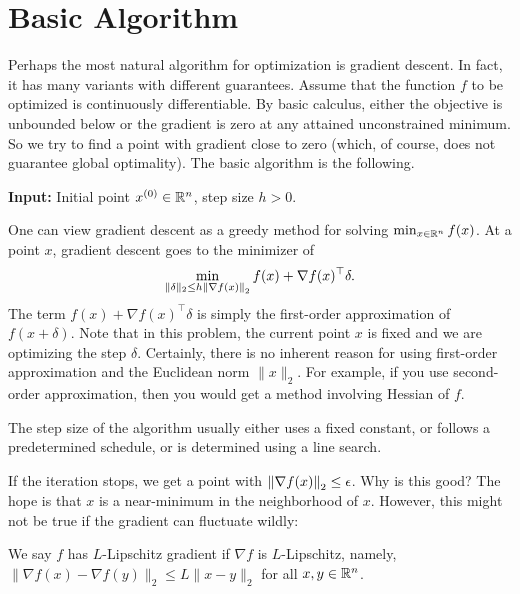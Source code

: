 \section{Basic Algorithm\label{sec:Gradient-Descent}}

Perhaps the most natural algorithm for optimization is gradient descent.
In fact, it has many variants with different guarantees. Assume that
the function $f$ to be optimized is continuously differentiable.
By basic calculus, either the objective is unbounded below or the
gradient is zero at any attained unconstrained minimum. So we try
to find a point with gradient close to zero (which, of course, does
not guarantee global optimality). The basic algorithm is the following. 

\begin{algorithm2e}[H]

\caption{$\mathtt{GradientDescent}$ (GD)}

\SetAlgoLined

\textbf{Input:} Initial point $x^{(0)}\in\mathbb{R}^{n}$, step size $h>0$.


\end{algorithm2e}

One can view gradient descent as a greedy method for solving $\min_{x\in\mathbb{R}^{n}}f(x)$.
At a point $x$, gradient descent goes to the minimizer of 
\[
\min_{\|\delta\|_{2}\leq h\left\Vert \nabla f(x)\right\Vert_{2}}f(x)+\nabla f(x)^{\top}\delta.
\]
The term $f(x)+\nabla f(x)^{\top}\delta$ is simply the first-order
approximation of $f(x+\delta)$. Note that in this problem, the current
point $x$ is fixed and we are optimizing the step $\delta$. Certainly,
there is no inherent reason for using first-order approximation and
the Euclidean norm $\|x\|_{2}$. For example, if you use second-order
approximation, then you would get a method involving Hessian of $f$.

The step size of the algorithm usually either uses a fixed constant,
or follows a predetermined schedule, or is determined using a line
search.

If the iteration stops, we get a point with $\left\Vert \nabla f(x)\right\Vert_{2}\le\epsilon$.
Why is this good? The hope is that $x$ is a near-minimum in the neighborhood
of $x$. However, this might not be true if the gradient can fluctuate
wildly:
\begin{defn}
We say $f$ has $L$-Lipschitz gradient if $\nabla f$ is $L$-Lipschitz,
namely, $\|\nabla f(x)-\nabla f(y)\|_{2}\leq L\|x-y\|_{2}$ for all
$x,y\in\mathbb{R}^{n}$.
\end{defn}

